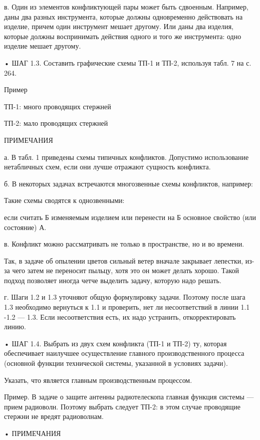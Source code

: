 в.  Один  из  элементов   конфликтующей  пары  может  быть  сдвоенным.
Например,  даны два  разных инструмента,  которые должны  одновременно
действовать  на изделие,  причем один  инструмент мешает  другому. Или
даны два изделия,  которые должны воспринимать действия  одного и того
же инструмента: одно изделие мешает другому.




• ШАГ 1.3. Составить графические схемы  ТП-1 и ТП-2, используя табл. 7
на с. 264.


Пример

ТП-1: много проводящих стержней


ТП-2: мало проводящих стержней


ПРИМЕЧАНИЯ

а.  В   табл.  1   приведены  схемы  типичных   конфликтов.  Допустимо
использование  нетабличных  схем,  если они  лучше  отражают  сущность
конфликта.

б.  В некоторых  задачах  встречаются  многозвенные схемы  конфликтов,
например:

Такие схемы сводятся к однозвенными:


если  считать  Б  изменяемым  изделием или  перенести  на  Б  основное
свойство (или состояние) А.


в.  Конфликт можно  рассматривать не  только в  пространстве, но  и во
времени.

Так,  в задаче  об  опылении цветов  сильный  ветер вначале  закрывает
лепестки,  из-за чего  затем не  переносит пыльцу,  хотя это  он может
делать хорошо.  Такой подход  позволяет иногда четче  выделить задачу,
которую надо решать.


г. Шаги  1.2 и 1.3  уточняют общую формулировку задачи.  Поэтому после
шага 1.3 необходимо вернуться к 1.1 и проверить, нет ли несоответствий
в линии 1.1  -1.2 — 1.3. Если несоответствия есть,  их надо устранить,
откорректировать линию.


• ШАГ  1.4. Выбрать из двух  схем конфликта (ТП-1 и  ТП-2) ту, которая
обеспечивает   наилучшее   осуществление  главного   производственного
процесса (основной  функции технической системы, указанной  в условиях
задачи).


Указать, что является главным производственным процессом.

Пример.  В  задаче о  защите  антенны  радиотелескопа главная  функция
системы — прием радиоволн. Поэтому выбрать следует ТП-2: в этом случае
проводящие стержни не вредят радиоволнам.


• ПРИМЕЧАНИЯ

